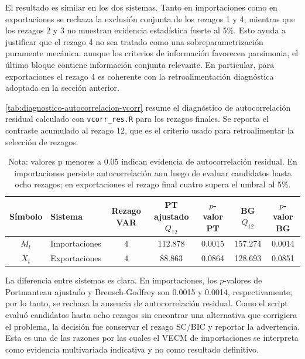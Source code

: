 \documentclass[11pt,a4paper]{article}
\begin{document}
	El resultado es similar en los dos sistemas. Tanto en importaciones como en
	exportaciones se rechaza la exclusión conjunta de los rezagos 1 y 4, mientras
	que los rezagos 2 y 3 no muestran evidencia estadística fuerte al 5\%. Esto
	ayuda a justificar que el rezago 4 no sea tratado como una sobreparametrización
	puramente mecánica: aunque los criterios de información favorecen parsimonia,
	el último bloque contiene información conjunta relevante. En particular, para
	exportaciones el rezago 4 es coherente con la retroalimentación diagnóstica
	adoptada en la sección anterior.

	\autoref{tab:diagnostico-autocorrelacion-vcorr} resume el diagnóstico de
	autocorrelación residual calculado con \texttt{vcorr\_res.R} para los rezagos
	finales. Se reporta el contraste acumulado al rezago 12, que es el criterio
	usado para retroalimentar la selección de rezagos.

	\begin{table}[H]
		\centering
		\caption{Diagnóstico de autocorrelación residual con \texttt{vcorr\_res.R}.}
		\label{tab:diagnostico-autocorrelacion-vcorr}
		\small
		\begin{tabular}{clccccc}
			\toprule
			Símbolo & Sistema & Rezago VAR & PT ajustado \(Q_{12}\) & \(p\)-valor PT & BG \(Q_{12}\) & \(p\)-valor BG \\
			\midrule
			\(M_t\) & Importaciones & 4 & 112.878 & 0.0015 & 157.274 & 0.0014 \\
			\(X_t\) & Exportaciones & 4 & 88.863 & 0.0864 & 128.693 & 0.0851 \\
			\bottomrule
		\end{tabular}
		\caption*{\footnotesize Nota: valores p menores a 0.05 indican evidencia de
			autocorrelación residual. En importaciones persiste autocorrelación aun luego
			de evaluar candidatos hasta ocho rezagos; en exportaciones el rezago final
			cuatro supera el umbral al 5\%.}
	\end{table}

	La diferencia entre sistemas es clara. En importaciones, los \(p\)-valores de
	Portmanteau ajustado y Breusch-Godfrey son 0.0015 y 0.0014, respectivamente;
	por lo tanto, se rechaza la ausencia de autocorrelación residual. Como el
	script evaluó candidatos hasta ocho rezagos sin encontrar una alternativa que
	corrigiera el problema, la decisión fue conservar el rezago SC/BIC y reportar
	la advertencia. Esta es una de las razones por las cuales el VECM de
	importaciones se interpreta como evidencia multivariada indicativa y no como
	resultado definitivo.
\end{document}
